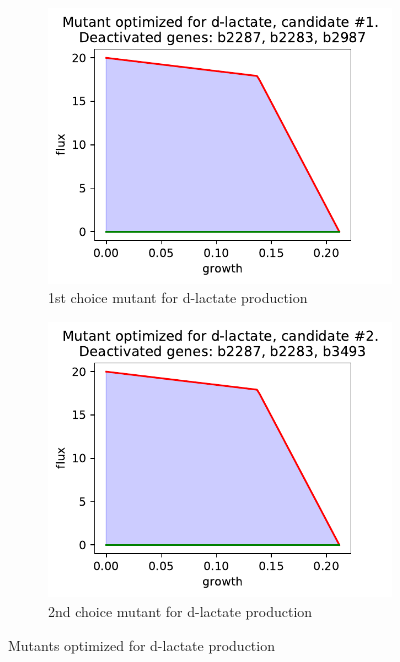 \documentclass{scrartcl}
\begin{document}

   \begin{figure}[h]
      \centering
      \begin{subfigure}{.49\textwidth}
         \centering
         \includegraphics[width=\linewidth]{q1_results/result_q1_d-lactate_1.pdf}
         \caption{1st choice mutant for d-lactate production}
         \label{fig:d-lactate_mutant_1}
      \end{subfigure}%
      \begin{subfigure}{.49\textwidth}
         \centering
         \includegraphics[width=\linewidth]{q1_results/result_q1_d-lactate_2.pdf}
         \caption{2nd choice mutant for d-lactate production}
         \label{fig:d-lactate_mutant_2}
      \end{subfigure}
      \caption{Mutants optimized for d-lactate production}
      \label{fig:d-lactate_mutants}
   \end{figure}
   
\end{document}
